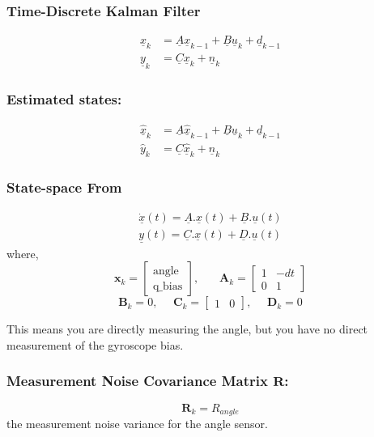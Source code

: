 \subsubsection{Time-Discrete Kalman Filter}
$$
\begin{aligned}
	\underline{x}_{k} &= \underline{A} \underline{x}_{k-1} + \underline{B} \underline{u}_{k} + \underline{d}_{k-1} \\
	\underline{y}_{k} &= \underline{C} \underline{x}_{k} + \underline{n}_{k}
\end{aligned}
$$
\subsubsection{
	Estimated states:
}
$$
\begin{aligned}
	\underline{\hat{x}}_{k} &= \underline{A} \underline{\hat{x}}_{k-1} + \underline{B} \underline{u}_{k} + \underline{d}_{k-1} \\
	\hat{y}_{k} &= \underline{C} \underline{\hat{x}}_{k} + \underline{n}_{k}
\end{aligned}
$$
\subsubsection{
	State-space From
}
$$
\begin{aligned}
	\underline{\dot{x}}(t) = \underline{A}.\underline{x}(t) + \underline{B}.\underline{u}(t) \\
	\underline{y}(t) = \underline{C}.\underline{x}(t) + \underline{D}.\underline{u}(t)
\end{aligned}
$$
where,
$$
\mathbf{x}_{k} = \begin{bmatrix} \text{angle} \\ \text{q\_bias} \end{bmatrix}, \ \ \ \ \ \ \ \  
\mathbf{A}_k = \begin{bmatrix} 1 & -dt \\ 0 & 1 \end{bmatrix}
$$
$$
\mathbf{B}_k = 0  ,\ \ \ \ \ \ 
\mathbf{C}_k = \begin{bmatrix} 1 & 0 \end{bmatrix} ,\ \ \ \ \ \
\mathbf{D}_k = 0
$$


This means you are directly measuring the angle, but you have no direct measurement of the gyroscope bias.

\subsubsection{
	Measurement Noise Covariance Matrix $\mathbf{R}$:
}
$$
\mathbf{R}_{k} = R_{angle}
$$
the measurement noise variance for the angle sensor.

